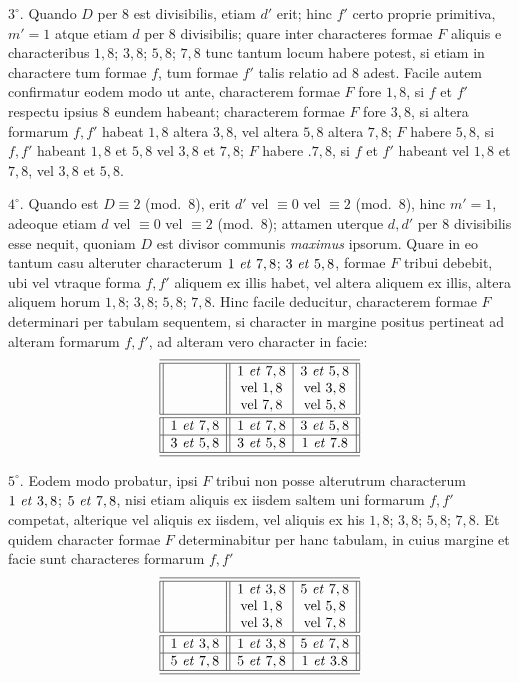 $3^{\circ}$. Quando $D$ per $8$ est divisibilis, etiam $d'$ erit; hinc $f'$ certo proprie primitiva, $m'=1$ atque etiam $d$ per $8$ divisibilis; quare inter characteres formae $F$ aliquis e characteribus $1,8$; $3,8$; $5,8$; $7,8$ tunc tantum locum habere potest, si etiam in charactere tum formae $f$, tum formae $f'$ talis relatio ad $8$ adest. Facile autem confirmatur eodem modo ut ante, characterem formae $F$ fore $1,8$, si $f$ et $f'$ respectu ipsius $8$ eundem habeant; characterem formae $F$ fore $3,8$, si altera formarum $f,f'$ habeat $1,8$ altera $3,8$, vel altera $5,8$ altera $7,8$; $F$ habere $5,8$, si $f,f'$ habeant $1,8$ et $5,8$ vel $3,8$ et $7,8$; $F$ habere $.7,8$, si $f$ et $f'$ habeant vel $1,8$ et $7,8$, vel $3,8$ et $5,8$.

$4^{\circ}$. Quando est $D\equiv2$ (mod.\ $8$), erit $d'$ vel $\equiv0$ vel $\equiv2$ (mod.\ $8$), hinc $m'=1$, adeoque etiam $d$ vel $\equiv0$ vel $\equiv2$ (mod.\ $8$); attamen uterque $d,d'$ per $8$ divisibilis esse nequit, quoniam $D$ est divisor communis \textit{maximus} ipsorum. Quare in eo tantum casu alteruter characterum $1\text{ \textit{et} }7,8$; $3\text{ \textit{et} }5,8$, formae $F$ tribui debebit, ubi vel vtraque forma $f,f'$ aliquem ex illis habet, vel altera aliquem ex illis, altera aliquem horum $1,8$; $3,8$; $5,8$; $7,8$. Hinc facile deducitur, characterem formae $F$ determinari per tabulam sequentem, si character in margine positus pertineat ad alteram formarum $f,f'$, ad alteram vero character in facie:
\[
\begin{array}{||c||c|c||}
\hline\hline
 & 1\text{ \textit{et} }7,8 & 3\text{ \textit{et} }5,8 \\
 & \text{vel }1,8 & \text{vel }3,8 \\
 & \text{vel }7,8 & \text{vel }5,8 \\
\hline\hline
1\text{ \textit{et} }7,8 & 1\text{ \textit{et} }7,8 & 3\text{ \textit{et} }5,8 \\
\hline
3\text{ \textit{et} }5,8 & 3\text{ \textit{et} }5,8 & 1\text{ \textit{et} }7.8 \\
\hline\hline
\end{array}
\]

$5^{\circ}$. Eodem modo probatur, ipsi $F$ tribui non posse alterutrum characterum $1\text{ \textit{et} }3,8$; $5\text{ \textit{et} }7,8$, nisi etiam aliquis ex iisdem saltem uni formarum $f,f'$ competat, alterique vel aliquis ex iisdem, vel aliquis ex his $1,8$; $3,8$; $5,8$; $7,8$.
Et quidem character formae $F$ determinabitur per hanc tabulam, in cuius margine et facie sunt characteres formarum $f,f'$
\[
\begin{array}{||c||c|c||}
\hline\hline
 & 1\text{ \textit{et} }3,8 & 5\text{ \textit{et} }7,8 \\
 & \text{vel }1,8 & \text{vel }5,8 \\
 & \text{vel }3,8 & \text{vel }7,8 \\
\hline\hline
1\text{ \textit{et} }3,8 & 1\text{ \textit{et} }3,8 & 5\text{ \textit{et} }7,8 \\
\hline
5\text{ \textit{et} }7,8 & 5\text{ \textit{et} }7,8 & 1\text{ \textit{et} }3.8 \\
\hline\hline
\end{array}
\]

